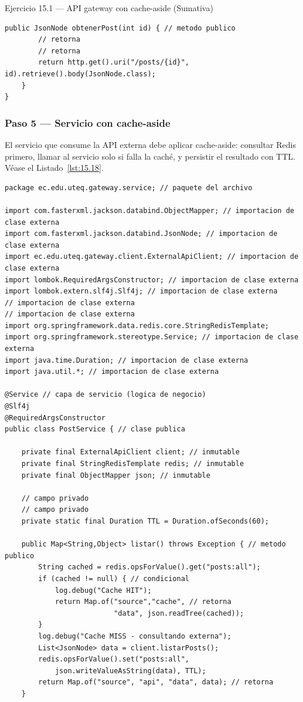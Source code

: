 \begin{cajaejercicio}{Ejercicio 15.1 --- API gateway con cache-aside (Sumativa)}
\begin{lstlisting}[style=java,caption={ExternalApiClient.java},label=lst:15.17]
    public JsonNode obtenerPost(int id) { // metodo publico
        // retorna
        // retorna
        return http.get().uri("/posts/{id}", id).retrieve().body(JsonNode.class);
    }
}
\end{lstlisting}

\subsubsection*{Paso 5 --- Servicio con cache-aside}

El servicio que consume la API externa debe aplicar
cache-aside: consultar Redis primero, llamar al servicio solo si
falla la caché, y persistir el resultado con TTL. V\'ease el Listado~\ref{lst:15.18}.


\begin{lstlisting}[style=java,caption={PostService.java},label=lst:15.18]
package ec.edu.uteq.gateway.service; // paquete del archivo

import com.fasterxml.jackson.databind.ObjectMapper; // importacion de clase externa
import com.fasterxml.jackson.databind.JsonNode; // importacion de clase externa
import ec.edu.uteq.gateway.client.ExternalApiClient; // importacion de clase externa
import lombok.RequiredArgsConstructor; // importacion de clase externa
import lombok.extern.slf4j.Slf4j; // importacion de clase externa
// importacion de clase externa
// importacion de clase externa
import org.springframework.data.redis.core.StringRedisTemplate;
import org.springframework.stereotype.Service; // importacion de clase externa
import java.time.Duration; // importacion de clase externa
import java.util.*; // importacion de clase externa

@Service // capa de servicio (logica de negocio)
@Slf4j
@RequiredArgsConstructor
public class PostService { // clase publica

    private final ExternalApiClient client; // inmutable
    private final StringRedisTemplate redis; // inmutable
    private final ObjectMapper json; // inmutable

    // campo privado
    // campo privado
    private static final Duration TTL = Duration.ofSeconds(60);

    public Map<String,Object> listar() throws Exception { // metodo publico
        String cached = redis.opsForValue().get("posts:all");
        if (cached != null) { // condicional
            log.debug("Cache HIT");
            return Map.of("source","cache", // retorna
                          "data", json.readTree(cached));
        }
        log.debug("Cache MISS - consultando externa");
        List<JsonNode> data = client.listarPosts();
        redis.opsForValue().set("posts:all",
            json.writeValueAsString(data), TTL);
        return Map.of("source", "api", "data", data); // retorna
    }


\end{lstlisting}
\end{cajaejercicio}
